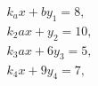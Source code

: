\documentclass[leqno]{article}
\begin{document}
\begin{align}
    k_ax+by_1=8, \\
    k_2ax+y_2=10,
\end{align}
\begin{gather}
    k_3ax+6y_3=5, \\
    k_4x+9y_4=7,
\end{gather}
\end{document}
